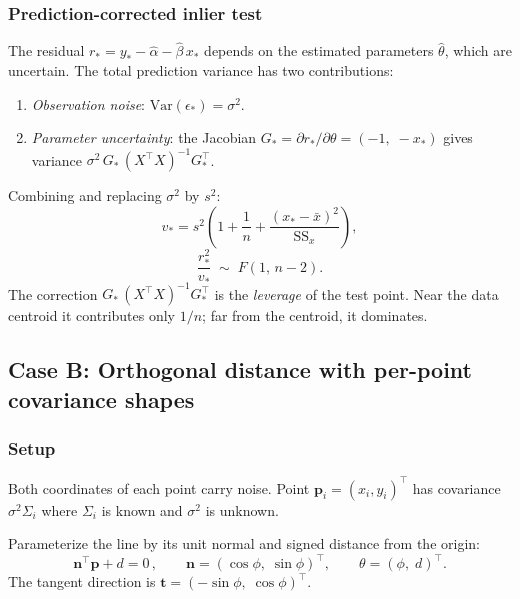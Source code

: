 \documentclass[11pt]{article}
\begin{document}
\subsubsection{Prediction-corrected inlier test}

The residual $r_* = y_* - \hat\alpha - \hat\beta\, x_*$
depends on the estimated parameters $\hat\theta$, which are uncertain.
The total prediction variance has two contributions:
\begin{enumerate}
\item \emph{Observation noise}: $\mathrm{Var}(\epsilon_*) = \sigma^2$.
\item \emph{Parameter uncertainty}: the Jacobian
  $G_* = \partial r_* / \partial \theta = (-1,\; -x_*)$ gives variance
  $\sigma^2\, G_*\, (X^\top X)^{-1} G_*^\top$.
\end{enumerate}
Combining and replacing $\sigma^2$ by $s^2$:
\begin{equation}
  v_* = s^2 \left(1 + \frac{1}{n} + \frac{(x_* - \bar{x})^2}{\mathrm{SS}_x}\right),
\end{equation}
\begin{equation}
  \boxed{
    \frac{r_*^2}{v_*} \;\sim\; F(1,\, n-2).
  }
\end{equation}
The correction $G_*\, (X^\top X)^{-1} G_*^\top$ is the \emph{leverage}
of the test point. Near the data centroid it contributes only $1/n$;
far from the centroid, it dominates.

\subsection{Case B: Orthogonal distance with per-point covariance shapes}

\subsubsection{Setup}

Both coordinates of each point carry noise.
Point $\mathbf{p}_i = (x_i, y_i)^\top$ has covariance
$\sigma^2 \Sigma_i$ where $\Sigma_i$ is known and $\sigma^2$ is unknown.

Parameterize the line by its unit normal and signed distance from the origin:
\begin{equation}
  \mathbf{n}^\top \mathbf{p} + d = 0\,,
  \qquad
  \mathbf{n} = (\cos\phi,\; \sin\phi)^\top,
  \qquad
  \theta = (\phi,\; d)^\top.
\end{equation}
The tangent direction is $\mathbf{t} = (-\sin\phi,\; \cos\phi)^\top$.
\end{document}
